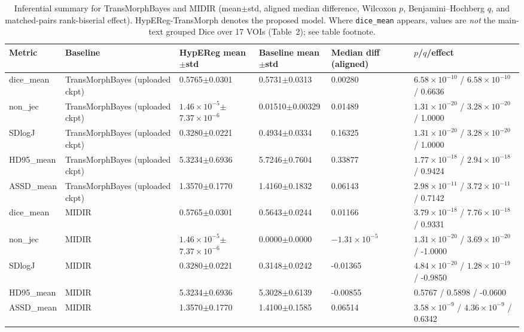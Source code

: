\documentclass[11pt,a4paper]{article}
\begin{document}
\begin{table}[H]
\caption{Inferential summary for TransMorphBayes and MIDIR (mean\(\pm\)std, aligned median difference, Wilcoxon \(p\), Benjamini--Hochberg \(q\), and matched-pairs rank-biserial effect). HypEReg-TransMorph denotes the proposed model. Where \texttt{dice\_mean} appears, values are \emph{not} the main-text grouped Dice over 17 VOIs (Table~2); see table footnote.}
\scriptsize
\setlength{\tabcolsep}{3pt}
\renewcommand{\arraystretch}{1.1}
\begin{tabularx}{\textwidth}{llXXXX}
\toprule
\textbf{Metric} & \textbf{Baseline} & \textbf{HypEReg mean\(\pm\)std} & \textbf{Baseline mean\(\pm\)std} & \textbf{Median diff (aligned)} & \textbf{\(p\)/\(q\)/effect}\\
\midrule
dice\_mean & TransMorphBayes (uploaded ckpt) & 0.5765\(\pm\)0.0301 & 0.5731\(\pm\)0.0313 & 0.00280 & \(6.58\times10^{-10}\) / \(6.58\times10^{-10}\) / 0.6636\\
non\_jec & TransMorphBayes (uploaded ckpt) & \(1.46\times10^{-5}\)\(\pm\)\(7.37\times10^{-6}\) & 0.01510\(\pm\)0.00329 & 0.01489 & \(1.31\times10^{-20}\) / \(3.28\times10^{-20}\) / 1.0000\\
SDlogJ & TransMorphBayes (uploaded ckpt) & 0.3280\(\pm\)0.0221 & 0.4934\(\pm\)0.0334 & 0.16325 & \(1.31\times10^{-20}\) / \(3.28\times10^{-20}\) / 1.0000\\
HD95\_mean & TransMorphBayes (uploaded ckpt) & 5.3234\(\pm\)0.6936 & 5.7246\(\pm\)0.7604 & 0.33877 & \(1.77\times10^{-18}\) / \(2.94\times10^{-18}\) / 0.9424\\
ASSD\_mean & TransMorphBayes (uploaded ckpt) & 1.3570\(\pm\)0.1770 & 1.4160\(\pm\)0.1832 & 0.06143 & \(2.98\times10^{-11}\) / \(3.72\times10^{-11}\) / 0.7142\\
\midrule
dice\_mean & MIDIR & 0.5765\(\pm\)0.0301 & 0.5643\(\pm\)0.0244 & 0.01166 & \(3.79\times10^{-18}\) / \(7.76\times10^{-18}\) / 0.9331\\
non\_jec & MIDIR & \(1.46\times10^{-5}\)\(\pm\)\(7.37\times10^{-6}\) & 0.0000\(\pm\)0.0000 & \(-1.31\times10^{-5}\) & \(1.31\times10^{-20}\) / \(3.69\times10^{-20}\) / -1.0000\\
SDlogJ & MIDIR & 0.3280\(\pm\)0.0221 & 0.3148\(\pm\)0.0242 & -0.01365 & \(4.84\times10^{-20}\) / \(1.28\times10^{-19}\) / -0.9850\\
HD95\_mean & MIDIR & 5.3234\(\pm\)0.6936 & 5.3028\(\pm\)0.6139 & -0.00855 & 0.5767 / 0.5898 / -0.0600\\
ASSD\_mean & MIDIR & 1.3570\(\pm\)0.1770 & 1.4100\(\pm\)0.1585 & 0.06514 & \(3.58\times10^{-9}\) / \(4.36\times10^{-9}\) / 0.6342\\

\end{tabularx}
\end{table}
\end{document}
